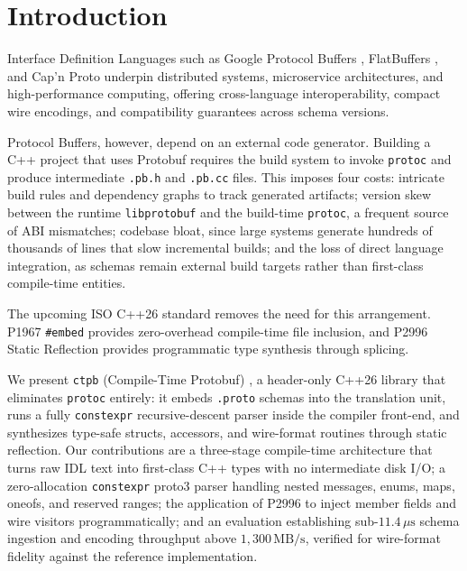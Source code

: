 \section{Introduction}

Interface Definition Languages such as Google Protocol Buffers \cite{protobuf_spec}, FlatBuffers \cite{flatbuffers}, and Cap'n Proto \cite{capnproto} underpin distributed systems, microservice architectures, and high-performance computing, offering cross-language interoperability, compact wire encodings, and compatibility guarantees across schema versions.

Protocol Buffers, however, depend on an external code generator. Building a C++ project that uses Protobuf requires the build system to invoke \texttt{protoc} and produce intermediate \texttt{.pb.h} and \texttt{.pb.cc} files. This imposes four costs: intricate build rules and dependency graphs to track generated artifacts; version skew between the runtime \texttt{libprotobuf} and the build-time \texttt{protoc}, a frequent source of ABI mismatches; codebase bloat, since large systems generate hundreds of thousands of lines that slow incremental builds; and the loss of direct language integration, as schemas remain external build targets rather than first-class compile-time entities.

The upcoming ISO C++26 standard removes the need for this arrangement. P1967 \texttt{\#embed} \cite{p1967} provides zero-overhead compile-time file inclusion, and P2996 Static Reflection \cite{p2996} provides programmatic type synthesis through splicing.

We present \texttt{ctpb} (Compile-Time Protobuf) \cite{ctpb2026}, a header-only C++26 library that eliminates \texttt{protoc} entirely: it embeds \texttt{.proto} schemas into the translation unit, runs a fully \texttt{constexpr} recursive-descent parser inside the compiler front-end, and synthesizes type-safe structs, accessors, and wire-format routines through static reflection. Our contributions are a three-stage compile-time architecture that turns raw IDL text into first-class C++ types with no intermediate disk I/O; a zero-allocation \texttt{constexpr} proto3 parser handling nested messages, enums, maps, oneofs, and reserved ranges; the application of P2996 to inject member fields and wire visitors programmatically; and an evaluation establishing sub-$11.4\,\mu\text{s}$ schema ingestion and encoding throughput above $1{,}300\,\text{MB/s}$, verified for wire-format fidelity against the reference implementation.
